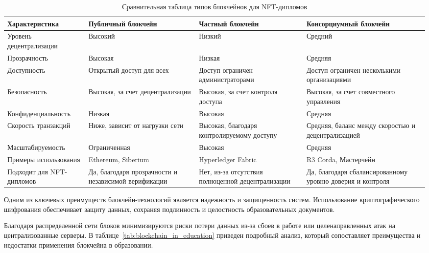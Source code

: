 \begin{table}[H]
    \caption{Сравнительная таблица типов блокчейнов для NFT-дипломов}
    \centering

    \emergencystretch=10pt
    \begin{tabular}{|x{5.6cm}|x{3cm}|x{3cm}|x{3cm}|}
        \hline
        \textbf{Характеристика} & \textbf{Публичный блокчейн} & \textbf{Частный блокчейн} & \textbf{Консорциумный блокчейн} \\ \hline
        Уровень децентрализации & Высокий & Низкий & Средний \\ \hline
        Прозрачность & Высокая & Низкая & Средняя \\ \hline
        Доступность & Открытый доступ для всех & Доступ ограничен администраторами & Доступ ограничен несколькими организациями \\ \hline
        Безопасность & Высокая, за счет децентрализации & Высокая, за счет контроля доступа & Высокая, за счет совместного управления \\ \hline
        Конфиденциальность & Низкая & Высокая & Средняя \\ \hline
        Скорость транзакций & Ниже, зависит от нагрузки сети & Высокая, благодаря контролируемому доступу & Средняя, баланс между скоростью и децентрализацией \\ \hline
        Масштабируемость & Ограниченная & Высокая & Средняя \\ \hline
        Примеры использования & Ethereum, Siberium & Hyperledger Fabric & R3 Corda, Мастерчейн \\ \hline
        Подходит для NFT-дипломов & Да, благодаря прозрачности и независимой верификации & Нет, из-за отсутствия полноценной децентрализации & Да, благодаря сбалансированному уровню доверия и контроля \\ \hline
    \end{tabular}
    \label{tab:blockchain_comparison}
\end{table}

Одним из ключевых преимуществ блокчейн-технологий является надежность и защищенность систем. Использование криптографического шифрования обеспечивает защиту данных, сохраняя подлинность и целостность образовательных документов.

Благодаря распределенной сети блоков минимизируются риски потери данных из-за сбоев в работе или целенаправленных атак на централизованные серверы. В таблице~\ref{tab:blockchain_in_education} приведен подробный анализ, который сопоставляет преимущества и недостатки применения блокчейна в образовании.


